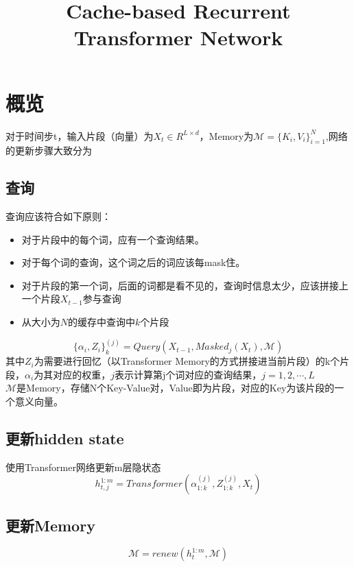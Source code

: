 \documentclass{article}
\title{Cache-based Recurrent Transformer Network} %
\author{%
}
\date{} %
\begin{document}
\maketitle

\section*{概览}
	对于时间步t，输入片段（向量）为$X_t \in R^{L\times d}$，Memory为$\mathcal{M} = \{K_i, V_i\}_{i=1}^N$,网络的更新步骤大致分为
	\subsection*{查询}
		查询应该符合如下原则：
		\begin{itemize}
			\item 对于片段中的每个词，应有一个查询结果。
			\item 对于每个词的查询，这个词之后的词应该每mask住。
			\item 对于片段的第一个词，后面的词都是看不见的，查询时信息太少，应该拼接上一个片段$X_{t-1}$参与查询
			\item 从大小为$N$的缓存中查询中$k$个片段
		\end{itemize}
		
		\begin{equation}
			\{\alpha_i, Z_i\}_k^{(j)} = Query(X_{t-1}, Masked_j(X_t), \mathcal{M})
		\end{equation}
		其中$Z_i$为需要进行回忆（以Transformer Memory的方式拼接进当前片段）的k个片段，$\alpha_i$为其对应的权重，$j$表示计算第j个词对应的查询结果，$j = 1,2,\cdots, L$\\
		$\mathcal{M}$是Memory，存储N个Key-Value对，Value即为片段，对应的Key为该片段的一个意义向量。
	\subsection*{更新hidden state}
		使用Transformer网络更新m层隐状态
		\begin{equation}
			h_{t,j}^{1:m} = Transformer(\alpha_{1:k}^{(j)},Z_{1:k}^{(j)}, X_t)
		\end{equation}
	\subsection*{更新Memory}
		\begin{equation}
			\mathcal{M} = renew(h_t^{1:m}, \mathcal{M})
		\end{equation}
\end{document}
